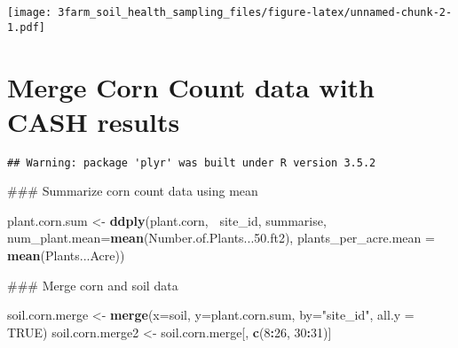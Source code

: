 \documentclass[]{article}
\newenvironment{Shaded}{\begin{snugshade}}{\end{snugshade}}
\newcommand{\KeywordTok}[1]{\textcolor[rgb]{0.13,0.29,0.53}{\textbf{#1}}}
\newcommand{\DataTypeTok}[1]{\textcolor[rgb]{0.13,0.29,0.53}{#1}}
\newcommand{\DecValTok}[1]{\textcolor[rgb]{0.00,0.00,0.81}{#1}}
\newcommand{\FloatTok}[1]{\textcolor[rgb]{0.00,0.00,0.81}{#1}}
\newcommand{\StringTok}[1]{\textcolor[rgb]{0.31,0.60,0.02}{#1}}
\newcommand{\OtherTok}[1]{\textcolor[rgb]{0.56,0.35,0.01}{#1}}
\newcommand{\OperatorTok}[1]{\textcolor[rgb]{0.81,0.36,0.00}{\textbf{#1}}}
\newcommand{\NormalTok}[1]{#1}
\begin{document}
\texttt{[image: 3farm\_soil\_health\_sampling\_files/figure-latex/unnamed-chunk-2-1.pdf]}

\section{Merge Corn Count data with CASH
results}\label{merge-corn-count-data-with-cash-results}

\begin{Shaded}
\end{Shaded}

\begin{verbatim}
## Warning: package 'plyr' was built under R version 3.5.2
\end{verbatim}

\begin{Shaded}
\begin{Highlighting}[]
\NormalTok{### Summarize corn count data using mean}

\NormalTok{plant.corn.sum <-}\StringTok{ }\KeywordTok{ddply}\NormalTok{(plant.corn, }\OperatorTok{~}\NormalTok{site_id, summarise, }\DataTypeTok{num_plant.mean=}\KeywordTok{mean}\NormalTok{(Number.of.Plants...}\FloatTok{50.}\NormalTok{ft2), }
                        \DataTypeTok{plants_per_acre.mean =} \KeywordTok{mean}\NormalTok{(Plants...Acre))}

\NormalTok{### Merge corn and soil data}

\NormalTok{soil.corn.merge <-}\StringTok{ }\KeywordTok{merge}\NormalTok{(}\DataTypeTok{x=}\NormalTok{soil, }\DataTypeTok{y=}\NormalTok{plant.corn.sum, }\DataTypeTok{by=}\StringTok{"site_id"}\NormalTok{, }\DataTypeTok{all.y =} \OtherTok{TRUE}\NormalTok{)}
\NormalTok{soil.corn.merge2 <-}\StringTok{ }\NormalTok{soil.corn.merge[, }\KeywordTok{c}\NormalTok{(}\DecValTok{8}\OperatorTok{:}\DecValTok{26}\NormalTok{, }\DecValTok{30}\OperatorTok{:}\DecValTok{31}\NormalTok{)]}
\end{Highlighting}
\end{Shaded}
\end{document}
